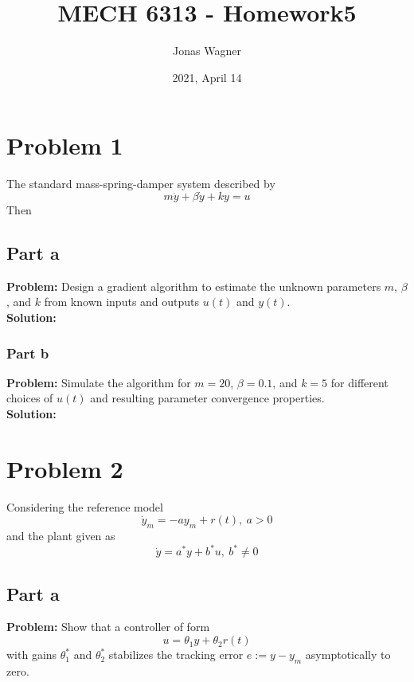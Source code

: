 \documentclass[letter]{article}
\title{MECH 6313 - Homework5}
\author{Jonas Wagner}
\date{2021, April 14}
\begin{document}
\maketitle

\section{Problem 1}
The standard mass-spring-damper system described by
\begin{equation}
	m \ddot{y} + \beta \dot{y} + k y = u
\end{equation}
 Then 

\subsection{Part a}
\textbf{Problem:}
Design a gradient algorithm to estimate the unknown parameters $m$, $\beta$, and $k$ from known inputs and outputs $u(t)$ and $y(t)$.\\

\noindent
\textbf{Solution:}




\subsubsection{Part b}
\textbf{Problem:}
Simulate the algorithm for $m = 20$, $\beta = 0.1$, and $k = 5$ for different choices of $u(t)$ and resulting parameter convergence properties.\\

\noindent
\textbf{Solution:}







\newpage
\section{Problem 2}
Considering the reference model
\begin{equation}
	\dot{y}_m = -a y_m + r(t), \ a>0
\end{equation}
and the plant given as
\begin{equation}
	\dot{y} = a^*y + b^* u, \ b^* \neq 0
\end{equation}

\subsection{Part a}
\textbf{Problem:}
Show that a controller of form $$u = \theta_1 y + \theta_2 r(t)$$ with gains $\theta^*_1$ and $\theta^*_2$ stabilizes the tracking error $e:= y-y_m$ asymptotically to zero.\\
\end{document}
